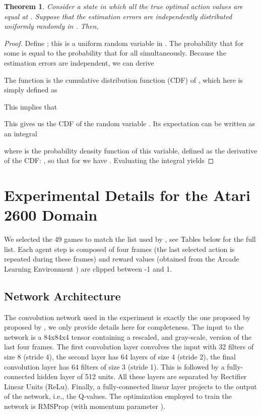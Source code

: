 \documentclass[letterpaper]{article}
\newtheorem{theorem}{Theorem}
\begin{document}
\begin{theorem}
Consider a state  in which all the true optimal action values are equal at .  Suppose that the estimation errors  are independently distributed uniformly randomly in .  Then,

\end{theorem}
\begin{proof}
Define ; this is a uniform random variable in .  The probability that  for some  is equal to the probability that  for all  simultaneously.  Because the estimation errors are independent, we can derive

The function  is the cumulative distribution function (CDF) of , which here is simply defined as

This implies that

This gives us the CDF of the random variable .  Its expectation can be written as an integral

where  is the probability density function of this variable, defined as the derivative of the CDF: , so that for  we have .  Evaluating the integral yields

\end{proof}

\section*{Experimental Details for the Atari 2600 Domain}

We selected the 49 games to match the list used by \citet{Mnih:2015}, see Tables below for the full list. Each agent step is composed of four frames (the last selected action is repeated during these frames) and reward values (obtained from the Arcade Learning Environment \citep{Bellemare:2013}) are clipped between -1 and 1. 

\subsection*{Network Architecture}

The convolution network used in the experiment is exactly the one proposed by proposed by \citet{Mnih:2015}, we only provide details here for completeness. The input to the network is a 84x84x4 tensor containing a rescaled, and gray-scale, version of the last four frames. The first convolution layer convolves the input with 32 filters of size 8 (stride 4), the second layer has 64 layers of size 4 (stride 2), the final convolution layer has 64 filters of size 3 (stride 1). 
This is followed by a fully-connected hidden layer of 512 units.
All these layers are separated by Rectifier Linear Units (ReLu). Finally, a fully-connected linear layer projects to the output of the network, i.e., the Q-values.
The optimization employed to train the network is RMSProp (with momentum parameter ). 
\end{document}
